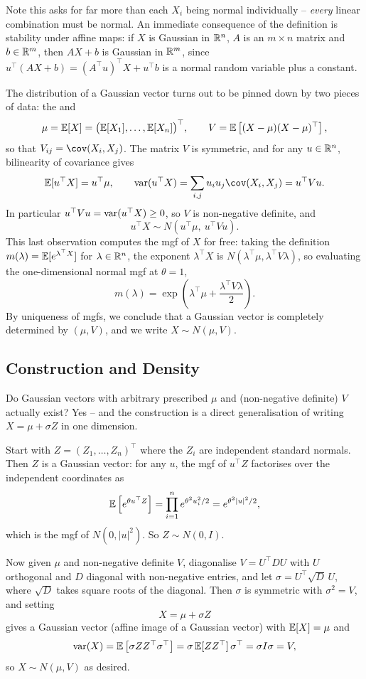 \documentclass[a4paper]{scrartcl}
\begin{document}
Note this asks for far more than each $X_i$ being normal individually -- \emph{every} linear combination must be normal. An immediate consequence of the definition is stability under affine maps: if $X$ is Gaussian in $\mathbb{R}^n$, $A$ is an $m \times n$ matrix and $b \in \mathbb{R}^m$, then $AX + b$ is Gaussian in $\mathbb{R}^m$, since $u^\top(AX + b) = (A^\top u)^\top X + u^\top b$ is a normal random variable plus a constant.

The distribution of a Gaussian vector turns out to be pinned down by two pieces of data: the  and 
$$
\mu = \mathbb{E}[X] = \big(\mathbb{E}[X_1], \dots, \mathbb{E}[X_n]\big)^\top, \qquad V = \mathbb{E}\left[(X - \mu)(X - \mu)^\top\right],
$$
so that $V_{ij} = \cov(X_i, X_j)$. The matrix $V$ is symmetric, and for any $u \in \mathbb{R}^n$, bilinearity of covariance gives
$$
\EE[u^\top X] = u^\top \mu, \qquad \var(u^\top X) = \sum_{i, j} u_i u_j \cov(X_i, X_j) = u^\top V u.
$$
In particular $u^\top V u = \operatorname{var}(u^\top X) \geq 0$, so $V$ is non-negative definite, and
$$
u^\top X \sim N(u^\top \mu,\ u^\top V u).
$$
This last observation computes the mgf of $X$ for free: taking the definition $m(\lambda) = \mathbb{E}[e^{\lambda^\top X}]$ for $\lambda \in \mathbb{R}^n$, the exponent $\lambda^\top X$ is $N(\lambda^\top\mu, \lambda^\top V \lambda)$, so evaluating the one-dimensional normal mgf at $\theta = 1$,
$$
m(\lambda) = \exp\left(\lambda^\top \mu + \frac{\lambda^\top V \lambda}{2}\right).
$$
By uniqueness of mgfs, we conclude that a Gaussian vector is completely determined by $(\mu, V)$, and we write $X \sim N(\mu, V)$.

\subsection{Construction and Density}

Do Gaussian vectors with arbitrary prescribed $\mu$ and (non-negative definite) $V$ actually exist? Yes -- and the construction is a direct generalisation of writing $X = \mu + \sigma Z$ in one dimension.

Start with $Z = (Z_1, \dots, Z_n)^\top$ where the $Z_i$ are independent standard normals. Then $Z$ is a Gaussian vector: for any $u$, the mgf of $u^\top Z$ factorises over the independent coordinates as
$$
\mathbb{E}\left[e^{\theta u^\top Z}\right] = \prod_{i = 1}^{n} e^{\theta^2 u_i^2 / 2} = e^{\theta^2 |u|^2/2},
$$
which is the mgf of $N(0, |u|^2)$. So $Z \sim N(0, I)$.

Now given $\mu$ and non-negative definite $V$, diagonalise $V = U^\top D U$ with $U$ orthogonal and $D$ diagonal with non-negative entries, and let $\sigma = U^\top \sqrt{D}\, U$, where $\sqrt{D}$ takes square roots of the diagonal. Then $\sigma$ is symmetric with $\sigma^2 = V$, and setting
$$
X = \mu + \sigma Z
$$
gives a Gaussian vector (affine image of a Gaussian vector) with $\mathbb{E}[X] = \mu$ and
$$
\operatorname{var}(X) = \mathbb{E}\left[\sigma Z Z^\top \sigma^\top\right] = \sigma\, \mathbb{E}[ZZ^\top]\, \sigma^\top = \sigma I \sigma = V,
$$
so $X \sim N(\mu, V)$ as desired.
\end{document}

